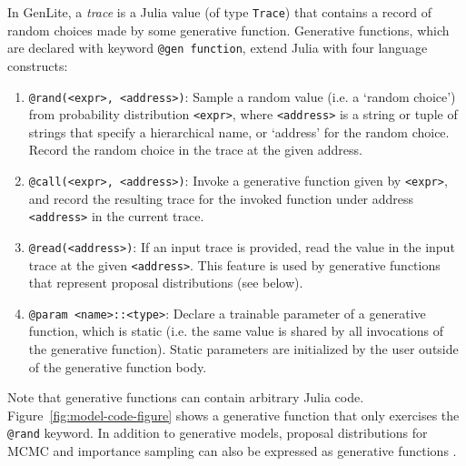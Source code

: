 \documentclass{article}
\newcommand{\expr}[0]{\texttt{<expr>}}
\newcommand{\address}[0]{\texttt{<address>}}
\begin{document}
In GenLite, a \emph{trace} is a Julia value (of type \texttt{Trace}) that contains a record of random choices made by some generative function.
Generative functions, which are declared with keyword \texttt{@gen function}, extend Julia with four language constructs:
\begin{enumerate}
\item \texttt{@rand(<expr>, <address>)}: Sample a random value (i.e. a `random choice') from probability distribution \expr{}, where \address{} is a string or tuple of strings that specify a hierarchical name, or `address' for the random choice.
Record the random choice in the trace at the given address.
\item \texttt{@call(<expr>, <address>)}: Invoke a generative function given by \expr{}, and record the resulting trace for the invoked function under address \address{} in the current trace.
\item \texttt{@read(<address>)}: If an input trace is provided, read the value in the input trace at the given \address{}.
This feature is used by generative functions that represent proposal distributions (see below).
\item \texttt{@param <name>::<type>}: Declare a trainable parameter of a generative function, which is static (i.e. the same value is shared by all invocations of the generative function).
Static parameters are initialized by the user outside of the generative function body.
\end{enumerate}

Note that generative functions can contain arbitrary Julia code.
Figure~\ref{fig:model-code-figure} shows a generative function that only exercises the \texttt{@rand} keyword.
In addition to generative models, proposal distributions for MCMC and importance sampling can also be expressed as generative functions \cite{cusumano2018using}.
\end{document}
